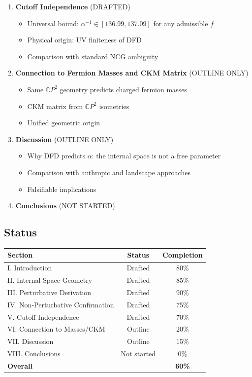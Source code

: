 \documentclass[11pt,a4paper]{article}
\newcommand{\CP}{\mathbb{C}P}
\begin{document}
\begin{enumerate}[label=\Roman*.]
\item \textbf{Cutoff Independence} (DRAFTED)
\begin{itemize}
\item Universal bound: $\alpha^{-1} \in [136.99, 137.09]$ for any admissible $f$
\item Physical origin: UV finiteness of DFD
\item Comparison with standard NCG ambiguity
\end{itemize}

\item \textbf{Connection to Fermion Masses and CKM Matrix} (OUTLINE ONLY)
\begin{itemize}
\item Same $\CP^2$ geometry predicts charged fermion masses
\item CKM matrix from $\CP^2$ isometries
\item Unified geometric origin
\end{itemize}

\item \textbf{Discussion} (OUTLINE ONLY)
\begin{itemize}
\item Why DFD predicts $\alpha$: the internal space is not a free parameter
\item Comparison with anthropic and landscape approaches
\item Falsifiable implications
\end{itemize}

\item \textbf{Conclusions} (NOT STARTED)
\end{enumerate}

\subsection{Status}

\begin{center}
\begin{tabular}{lcc}
\toprule
\textbf{Section} & \textbf{Status} & \textbf{Completion} \\
\midrule
I. Introduction & Drafted & 80\% \\
II. Internal Space Geometry & Drafted & 85\% \\
III. Perturbative Derivation & Drafted & 90\% \\
IV. Non-Perturbative Confirmation & Drafted & 75\% \\
V. Cutoff Independence & Drafted & 70\% \\
VI. Connection to Masses/CKM & Outline & 20\% \\
VII. Discussion & Outline & 15\% \\
VIII. Conclusions & Not started & 0\% \\
\midrule
\textbf{Overall} & & \textbf{60\%} \\
\bottomrule
\end{tabular}
\end{center}
\end{document}
